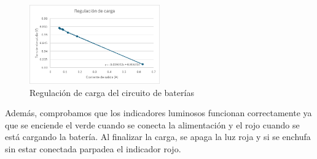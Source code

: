 \begin{figure}[h]
    \centering
    \includegraphics[width=0.5\textwidth]{images/4/4-2/regulacion-carga.png}
    \caption{Regulación de carga del circuito de baterías}
    \label{fig:4-2-2-regulacion-carga}
\end{figure}

Además, comprobamos que los indicadores luminosos funcionan correctamente ya que se enciende el verde cuando se conecta la alimentación y el rojo cuando se está cargando la batería. Al finalizar la carga, se apaga la luz roja y si se enchufa sin estar conectada parpadea el indicador rojo.